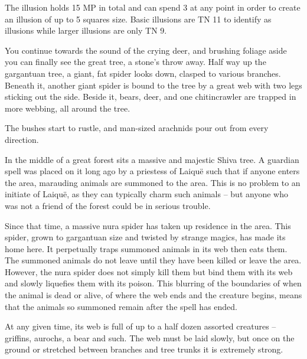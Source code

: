 \begin{multicols}{2}
The illusion holds 15 MP in total and can spend 3 at any point in order to create an illusion of up to 5 squares size.  Basic illusions are TN 11 to identify as illusions while larger illusions are only TN 9.


\begin{boxtext}

  You continue towards the sound of the crying deer, and brushing foliage aside you can finally see the great tree, a stone's throw away.
  Half way up the gargantuan tree, a giant, fat spider looks down, clasped to various branches.
  Beneath it, another giant spider is bound to the tree by a great web with two legs sticking out the side.
  Beside it, bears, deer, and one chitincrawler are trapped in more webbing, all around the tree.

  The bushes start to rustle, and man-sized arachnids pour out from every direction.

\end{boxtext}

In the middle of a great forest sits a massive and majestic Shiva tree.
A guardian spell was placed on it long ago by a priestess of Laiqu\"{e} such that if anyone enters the area, marauding animals are summoned to the area.
This is no problem to an initiate of Laiqu\"{e}, as they can typically charm such animals -- but anyone who was not a friend of the forest could be in serious trouble.

Since that time, a massive nura spider has taken up residence in the area.  This spider, grown to gargantuan size and twisted by strange magics, has made its home here.  It perpetually traps summoned animals in its web then eats them.  The summoned animals do not leave until they have been killed or leave the area.  However, the nura spider does not simply kill them but bind them with its web and slowly liquefies them with its poison.  This blurring of the boundaries of when the animal is dead or alive, of where the web ends and the creature begins, means that the animals so summoned remain after the spell has ended.

At any given time, its web is full of up to a half dozen assorted creatures -- griffins, aurochs, a bear and such.
The web must be laid slowly, but once on the ground or stretched between branches and tree trunks it is extremely strong.



\end{multicols}
